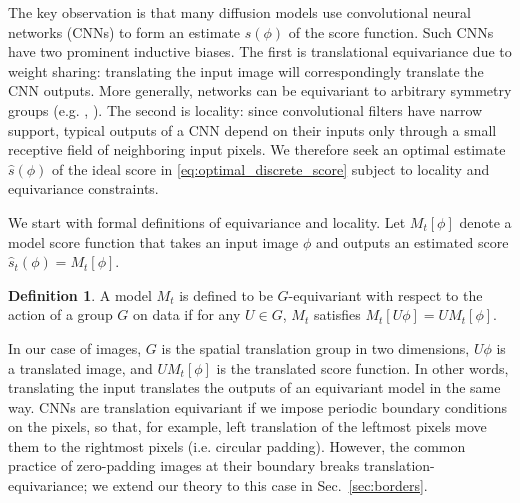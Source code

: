 \documentclass{article}
\theoremstyle{plain}
\theoremstyle{definition}
\newtheorem{definition}[theorem]{Definition}
\theoremstyle{remark}
\begin{document}
The key observation is that many diffusion models use convolutional neural networks (CNNs) to form an estimate $\hat s(\phi)$ of the score function. Such CNNs have two prominent inductive biases. The first is translational equivariance due to weight sharing: translating the input image will correspondingly translate the CNN outputs. More generally, networks can be equivariant to arbitrary symmetry groups (e.g. \cite{cohen2016group},  \cite{hoogeboom2022equivariant}). The second is locality: since convolutional filters have narrow support, typical outputs of a CNN depend on their inputs only through a small receptive field of neighboring input pixels.   We therefore seek an optimal estimate $\hat s(\phi)$ of the ideal score in \eqref{eq:optimal_discrete_score} subject to locality and equivariance constraints.  


We start with formal definitions of equivariance and locality. Let $M_t[\phi]$ denote a model score function that takes an input image $\phi$ and outputs an estimated score $\hat s_t(\phi) = M_t[\phi]$.
\begin{definition}
A model $M_t$ is defined to be $G$-equivariant with respect to the action of a group $G$ on data if for any $U \in G$, $M_t$ satisfies $M_t[U \phi] = U M_t[\phi]$.
\end{definition}
In our case of images, $G$ is the spatial translation group in two dimensions, $U\phi$ is a translated image, and $U M_t[\phi]$ is the translated score function. In other words, translating the input translates the outputs of an equivariant model in the same way. CNNs are translation equivariant if we impose periodic boundary conditions on the pixels, so that, for example, left translation of the leftmost pixels move them to the rightmost pixels (i.e. circular padding). However, the common practice of zero-padding images at their boundary breaks translation-equivariance; we extend our theory to this case in Sec.~\ref{sec:borders}.
\end{document}

